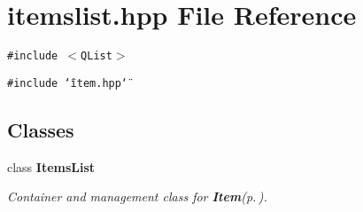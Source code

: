 \section{itemslist.hpp File Reference}
\label{itemslist_8hpp}
{\tt \#include $<$QList$>$}\par
{\tt \#include \char`\"{}item.hpp\char`\"{}}\par
\subsection*{Classes}
\begin{CompactItemize}
\item 
class {\bf Items\-List}
\begin{CompactList}\small\item\em Container and management class for {\bf Item}{\rm (p.\,\pageref{classItem})}. \item\end{CompactList}\end{CompactItemize}
